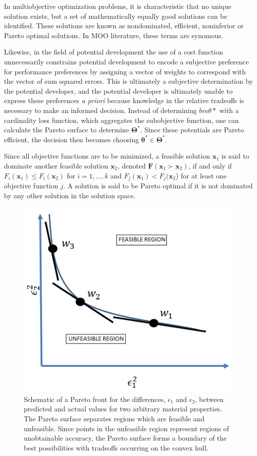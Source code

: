 In multiobjective optimization problems, it is characteristic that no unique solution exists, but a set of mathematically equally good solutions can be identified.  These solutions are known as nondominated, efficient, noninferior or Pareto optimal solutions.  In MOO literature, these terms are synomous.

Likewise, in the field of potential development the use of a cost function unnecessarily constrains potential development to encode a subjective preference for performance preferences by assigning a vector of weights to correspond with the vector of sum squared errors.  This is ultimately a subjective determination by the potential developer, and the potential developer is ultimately unable to express these preferences \emph{a priori} because knowledge in the relative tradeoffs is necessary to make an informed decision.  Instead of determining $bm{\theta}*$ with a cardinality loss function, which aggregates the subobjective function, one can calculate the Pareto surface to determine $\bm{\Theta}^*$.  Since these potentials are Pareto efficient, the decision then becomes choosing $\bm{\theta}^* \in \bm{\Theta}^*$.

Since all objective functions are to be minimized, a feasible solution $\bm{x}_1$ is said to dominate another feasible solution $\bm{x}_2$, denoted $\bm{F}(\bm{x}_1 \succ \bm{x}_2)$, if and only if $F_i(\bm{x}_1)\leq F_i(\bm{x}_2)$ for $i = 1,...,k$ and $F_j(\bm{x}_1)< F_j(\bm{x}_2$) for at least one objective function $j$.  A solution is said to be Pareto optimal if it is not dominated by any other solution in the solution space.

\begin{figure}[h]
	\centering
  \includegraphics{chapter3/pareto_schematic}
  \caption{Schematic of a Pareto front for the differences, $\epsilon_1$ and $\epsilon_2$, between predicted and actual values for two arbitrary material properties.  The Pareto surface separates regions which are feasible and unfeasible.  Since points in the unfeasible region represent regions of unobtainable accuracy, the Pareto surface forms a boundary of the best possibilities with tradeoffs occurring on the convex hull. }
  \label{fig:pareto_convex}
\end{figure}

